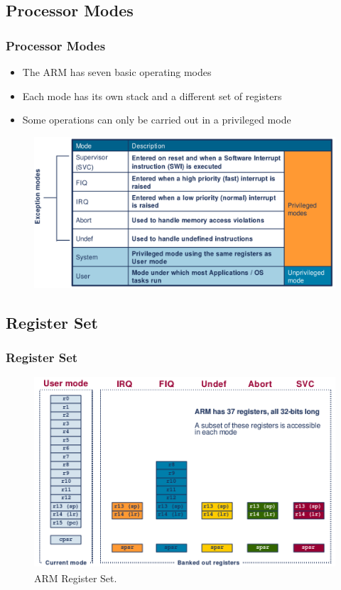 \documentclass{beamer}
\begin{document}
\subsection{Processor Modes}
\begin{frame}
\frametitle{Processor Modes}
\begin{itemize}
\item The ARM has seven basic operating modes
\item Each mode has its own stack and a different set of registers
\item Some operations can only be carried out in a privileged mode
\end{itemize}
\begin{figure}
\includegraphics[width=0.8\linewidth]{ARM_modes.png}

\end{figure}
\end{frame}


\subsection{Register Set}


\begin{frame}%
\frametitle{Register Set}
\begin{figure}
\includegraphics[width=0.8\linewidth]{ARM_register.png}
\caption{ARM Register Set.}
\end{figure}
\end{frame}
\end{document}
